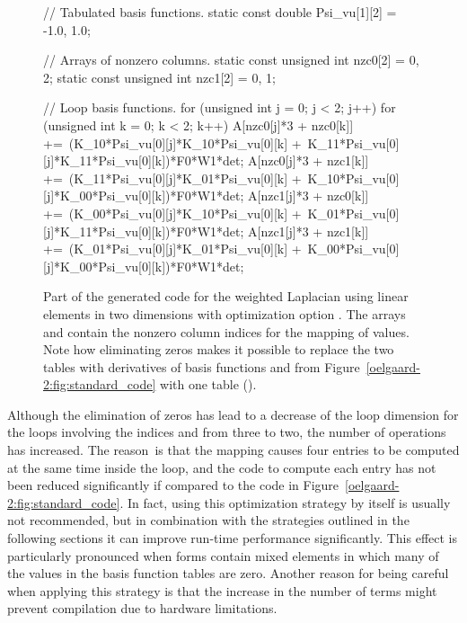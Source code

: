 \begin{figure}
\bwfig
\begin{c++}
// Tabulated basis functions.
static const double Psi_vu[1][2] = {{-1.0, 1.0}};

// Arrays of nonzero columns.
static const unsigned int nzc0[2] = {0, 2};
static const unsigned int nzc1[2] = {0, 1};

// Loop basis functions.
for (unsigned int j = 0; j < 2; j++)
{
 for (unsigned int k = 0; k < 2; k++)
 {
  A[nzc0[j]*3 + nzc0[k]] +=\
   (K_10*Psi_vu[0][j]*K_10*Psi_vu[0][k] +\
    K_11*Psi_vu[0][j]*K_11*Psi_vu[0][k])*F0*W1*det;
  A[nzc0[j]*3 + nzc1[k]] +=\
   (K_11*Psi_vu[0][j]*K_01*Psi_vu[0][k] +\
    K_10*Psi_vu[0][j]*K_00*Psi_vu[0][k])*F0*W1*det;
  A[nzc1[j]*3 + nzc0[k]] +=\
   (K_00*Psi_vu[0][j]*K_10*Psi_vu[0][k] +\
    K_01*Psi_vu[0][j]*K_11*Psi_vu[0][k])*F0*W1*det;
  A[nzc1[j]*3 + nzc1[k]] +=\
   (K_01*Psi_vu[0][j]*K_01*Psi_vu[0][k] +\
    K_00*Psi_vu[0][j]*K_00*Psi_vu[0][k])*F0*W1*det;
 }
}
\end{c++}
\caption{Part of the generated code for the weighted Laplacian using
  linear elements in two dimensions with optimization option \emp{-f
    eliminate\_zeros}.  The arrays  and  contain the
  nonzero column indices for the mapping of values.  Note how
  eliminating zeros makes it possible to replace the two tables with
  derivatives of basis functions  and
   from Figure~\ref{oelgaard-2:fig:standard_code} with
  one table ().}
\label{oelgaard-2:fig:O_zeros_code}
\end{figure}

\looseness-1{}Although the elimination of zeros has lead to a decrease of the loop
dimension for the loops involving the indices \emp{j} and \emp{k} from
three to two, the number of operations has increased.  The reason~is
that the mapping causes four entries to be computed at the same time
inside the loop, and the code to compute each entry has not been
reduced significantly if compared to the code in
Figure~\ref{oelgaard-2:fig:standard_code}.  In fact, using this
optimization strategy by itself is usually not recommended, but in
combination with the strategies outlined in the following sections it
can improve run-time performance significantly.  This effect is
particularly pronounced when forms contain mixed elements in which
many of the values in the basis function tables are zero.  Another
reason for being careful when applying this strategy is that the
increase in the number of terms might prevent \ffc{} compilation due
to hardware limitations.

